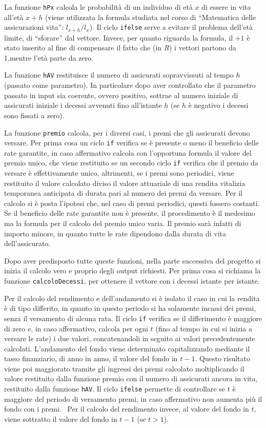 \documentclass[
]{article}
\begin{document}
La funzione \texttt{hPx} calcola le probabilità di un individuo di età
\(x\) di essere in vita all'età \(x+h\) (viene utilizzata la formula
studiata nel corso di ``Matematica delle assicurazioni vita'':
\(l_{x+h}/l_x\)). Il ciclo \texttt{ifelse} serve a evitare il problema
dell'età limite, di ``sforare'' dal vettore. Invece, per quanto riguarda
la formula, il \(+1\) è stato inserito al fine di compensare il fatto
che (in \emph{R}) i vettori partono da 1,mentre l'età parte da zero.

La funzione \texttt{hAV} restituisce il numero di assicurati
sopravvissuti al tempo \(h\) (passato come parametro). In particolare
dopo aver controllato che il parametro passato in input sia coerente,
ovvero positivo, sottrae al numero iniziale di assicurati iniziale i
decessi avvenuti fino all'istante \(h\) (se \(h\) è negativo i decessi
sono fissati a zero).

La funzione \texttt{premio} calcola, per i diversi casi, i premi che gli
assicurati devono versare. Per prima cosa un ciclo \texttt{if} verifica
se è presente o meno il beneficio delle rate garantite, in caso
affermativo calcola con l'opportuna formula il valore del premio unico,
che viene restituito se un secondo ciclo \texttt{if} verifica che il
premio da versare è effettivamente unico, altrimenti, se i premi sono
periodici, viene restituito il valore calcolato diviso il valore
attuariale di una rendita vitalizia temporanea anticipata di durata pari
al numero dei premi da versare. Per il calcolo si è posta l'ipotesi che,
nel caso di premi periodici, questi fossero costanti. Se il beneficio
delle rate garantite non è presente, il procedimento è il medesimo ma la
formula per il calcolo del premio unico varia. Il premio sarà infatti di
importo minore, in quanto tutte le rate dipendono dalla durata di vita
dell'assicurato.

Dopo aver predisposto tutte queste funzioni, nella parte successiva del
progetto si inizia il calcolo vero e proprio degli output richiesti. Per
prima cosa si richiama la funzione \texttt{calcoloDecessi}, per ottenere
il vettore con i decessi istante per istante.

Per il calcolo del rendimento e dell'andamento si è isolato il caso in
cui la rendita è di tipo differito, in quanto in questo periodo si ha
solamente incassi dei premi, senza il versamento di alcuna rata. Il
ciclo \texttt{if} verifica se il differimento è maggiore di zero e, in
caso affermativo, calcola per ogni \(t\) (fino al tempo in cui si inizia
a versare le rate) i due valori, concatenandoli in seguito ai valori
precedentemente calcolati. L'andamento del fondo viene determinato
capitalizzando mediante il tasso finanziario, di anno in anno, il valore
del fondo in \(t-1\). Questo risultato viene poi maggiorato tramite gli
ingressi dei premi calcolato moltiplicando il valore restituito dalla
funzione premio con il numero di assicurati ancora in vita, restituito
dalla funzione \texttt{hAV}. Il ciclo \texttt{ifelse} permette di
controllare se \(t\) è maggiore del periodo di versamento premi, in caso
affermativo non aumenta più il fondo con i premi.~ Per il calcolo del
rendimento invece, al valore del fondo in \(t\), viene sottratto il
valore del fondo in \(t-1\) (se \(t>1\)).
\end{document}
